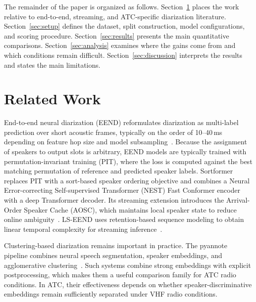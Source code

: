 \documentclass[conference]{IEEEtran}
\begin{document}
The remainder of the paper is organized as follows. Section~\ref{sec:related} places the work relative to end-to-end, streaming, and ATC-specific diarization literature. Section~\ref{sec:setup} defines the dataset, split construction, model configurations, and scoring procedure. Section~\ref{sec:results} presents the main quantitative comparisons. Section~\ref{sec:analysis} examines where the gains come from and which conditions remain difficult. Section~\ref{sec:discussion} interprets the results and states the main limitations.

\section{Related Work}
\label{sec:related}

End-to-end neural diarization (EEND) reformulates diarization as multi-label prediction over short acoustic frames, typically on the order of 10--40\,ms depending on feature hop size and model subsampling~\cite{fujita2019eend, park2022review}. Because the assignment of speakers to output slots is arbitrary, EEND models are typically trained with permutation-invariant training (PIT), where the loss is computed against the best matching permutation of reference and predicted speaker labels. Sortformer~\cite{park2024sortformer} replaces PIT with a sort-based speaker ordering objective and combines a Neural Error-correcting Self-supervised Transformer (NEST) Fast Conformer encoder~\cite{huang2025nest} with a deep Transformer decoder. Its streaming extension introduces the Arrival-Order Speaker Cache (AOSC), which maintains local speaker state to reduce online ambiguity~\cite{medennikov2025streaming}. LS-EEND uses retention-based sequence modeling to obtain linear temporal complexity for streaming inference~\cite{liang2024lseend}.

Clustering-based diarization remains important in practice. The pyannote pipeline combines neural speech segmentation, speaker embeddings, and agglomerative clustering~\cite{bredin2023pyannote, plaquet2023powerset}. Such systems combine strong embeddings with explicit postprocessing, which makes them a useful comparison family for ATC radio conditions. In ATC, their effectiveness depends on whether speaker-discriminative embeddings remain sufficiently separated under VHF radio conditions.
\end{document}
